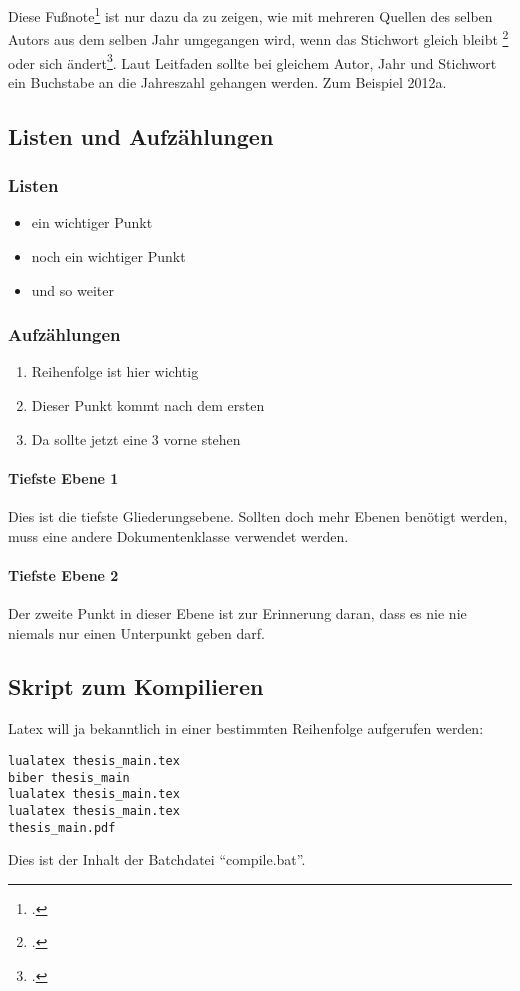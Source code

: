 Diese Fußnote\footcite[Vgl.][S.1]{Beckert.2012} ist nur dazu da zu zeigen, wie mit mehreren Quellen des selben Autors aus dem selben Jahr umgegangen wird, wenn das Stichwort gleich bleibt \footcite[Vgl.][S.2]{Beckert.2012.1} oder sich ändert\footcite[Vgl.][S.3]{Beckert.2012.2}. Laut Leitfaden sollte bei gleichem Autor, Jahr und Stichwort ein Buchstabe an die Jahreszahl gehangen werden. Zum Beispiel 2012a. 

\subsection{Listen und Aufzählungen}
\subsubsection{Listen}
\begin{itemize}
\item ein wichtiger Punkt
\item noch ein wichtiger Punkt
\item und so weiter
\end{itemize}
\subsubsection{Aufzählungen}
\begin{enumerate}
\item Reihenfolge ist hier wichtig
\item Dieser Punkt kommt nach dem ersten
\item Da sollte jetzt eine 3 vorne stehen
\end{enumerate}

\paragraph{Tiefste Ebene 1}
Dies ist die tiefste Gliederungsebene. Sollten doch mehr Ebenen benötigt werden, muss eine andere Dokumentenklasse verwendet werden.

\paragraph{Tiefste Ebene 2}
Der zweite Punkt in dieser Ebene ist zur Erinnerung daran, dass es nie nie niemals nur einen Unterpunkt geben darf.

\subsection{Skript zum Kompilieren}
Latex will ja bekanntlich in einer bestimmten Reihenfolge aufgerufen werden:
\begin{lstlisting}
lualatex thesis_main.tex
biber thesis_main
lualatex thesis_main.tex
lualatex thesis_main.tex
thesis_main.pdf
\end{lstlisting}

Dies ist der Inhalt der Batchdatei \enquote{compile.bat}.
